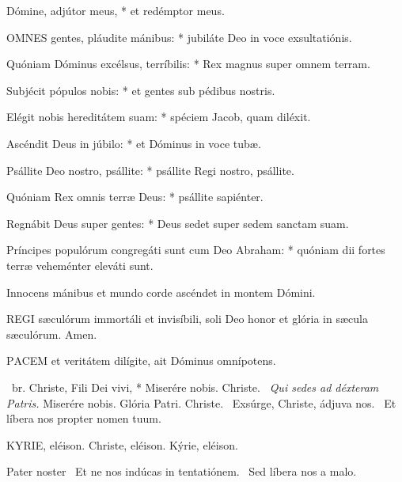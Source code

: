 Dómine, adjútor meus, * et redémptor meus.



\lettrine[lines=2]{O}{MNES} gentes, pláudite mánibus: * jubiláte Deo in voce exsultatiónis.

Quóniam Dóminus excélsus, terríbilis: * Rex magnus super omnem terram.

Subjécit pópulos nobis: * et gentes sub pédibus nostris.

Elégit nobis hereditátem suam: * spéciem Jacob, quam diléxit.

Ascéndit Deus in júbilo: * et Dóminus in voce tubæ.

Psállite Deo nostro, psállite: * psállite Regi nostro, psállite.

Quóniam Rex omnis terræ Deus: * psállite sapiénter.

Regnábit Deus super gentes: * Deus sedet super sedem sanctam suam.

Príncipes populórum congregáti sunt cum Deo Abraham: * quóniam dii fortes terræ veheménter eleváti sunt.


 Innocens mánibus et mundo corde ascéndet in montem Dómini.



\lettrine[lines=2]{R}{EGI} sæculórum immortáli et invisíbili, soli Deo honor et glória in sæcula sæculórum. Amen.



\lettrine[lines=2]{P}{ACEM} et veritátem dilígite, ait Dóminus omnípotens.

\R\ br. Christe, Fili Dei vivi, * Miserére nobis. Christe. \V\ \textit{Qui sedes ad déxteram Patris.} Miserére nobis. Glória Patri. Christe. \V\ Exsúrge, Christe, ádjuva nos. \R\ Et líbera nos propter nomen tuum.


KYRIE, eléison. Christe, eléison. Kýrie, eléison.

Pater noster  \V\ Et ne nos indúcas in tentatiónem. \R\ Sed líbera nos a malo.

